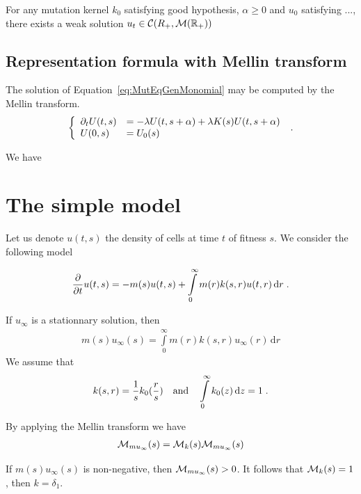 \documentclass[11pt]{amsart}
\newcommand{\diff}{\,\mathrm{d}}
\begin{document}
\begin{theorem}[Existence]
    For any mutation kernel $k_0$ satisfying good hypothesis, $\alpha \geq 0$ and $u_0$ satisfying ..., there exists a weak solution $u_t \in \mathcal{C}(R_+, \mathcal{M}(\mathbb{R}_+))$ 
\end{theorem}

\subsection{Representation formula with Mellin transform}

The solution of Equation~\eqref{eq:MutEqGenMonomial} may be computed by the Mellin transform. 
\begin{align}
    \left\{\begin{array}{ll}
        \partial_t U(t,s) &= -\lambda U(t,s+\alpha) + \lambda K(s) U(t,s+\alpha) \\
    U(0,s) &= U_0(s) 
    \end{array}
    \right.
    \; .
\end{align}

We have 

\section{The simple model}

Let us denote $u(t,s)$ the density of cells at time $t$ of fitness $s$. We consider the following model

\begin{align*}
\partialt u(t,s) = -m(s) u(t,s) + \int\limits_0^\infty m(r) k(s,r) u(t,r) \diff r
\eqfinp
\end{align*}

If $u_\infty$ is a stationnary solution, then 
    \begin{align*}
        m(s) u_\infty(s) = \int\limits_0^\infty m(r) k(s,r) u_\infty(r) \diff r
    \end{align*}
We assume that 
    \begin{align}
     k(s,r) = \frac{1}{s}k_0(\frac{r}{s})
     \mtext{and}
     \int\limits_0^\infty k_0(z) \diff z = 1
     \eqfinp
    \end{align}

By applying the Mellin transform we have
    \begin{align}
        \mathcal{M}_{mu_\infty}(s) =  \mathcal{M}_{k}(s)  \mathcal{M}_{mu_\infty}(s)  
    \end{align}

If $m(s)u_\infty(s)$ is non-negative, then $\mathcal{M}_{mu_\infty}(s) > 0$. It follows that $\mathcal{M}_{k}(s) = 1$, then $k = \delta_1$. 
\end{document}
